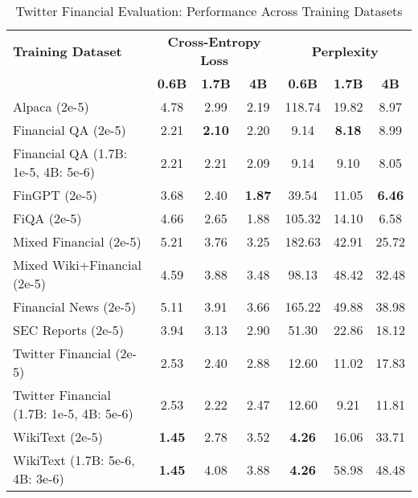 
\begin{table}[h]
\centering
\caption[Twitter Financial Evaluation: Cross-Dataset Performance]{Twitter Financial Evaluation: Performance Across Training Datasets}
\label{tab:cross_twitter}
\begin{tabular}{l|ccc|ccc}
\hline
\textbf{Training Dataset} & \multicolumn{3}{c|}{\textbf{Cross-Entropy Loss}} & \multicolumn{3}{c}{\textbf{Perplexity}} \\
\cline{2-4} \cline{5-7}
  & \textbf{0.6B} & \textbf{1.7B} & \textbf{4B} & \textbf{0.6B} & \textbf{1.7B} & \textbf{4B} \\
Alpaca (2e-5) & 4.78 & 2.99 & 2.19 & 118.74 & 19.82 & 8.97  \\
Financial QA (2e-5) & 2.21 & \textbf{2.10} & 2.20 & 9.14 & \textbf{8.18} & 8.99  \\
Financial QA (1.7B: 1e-5, 4B: 5e-6) & 2.21 & 2.21 & 2.09 & 9.14 & 9.10 & 8.05  \\
FinGPT (2e-5) & 3.68 & 2.40 & \textbf{1.87} & 39.54 & 11.05 & \textbf{6.46}  \\
FiQA (2e-5) & 4.66 & 2.65 & 1.88 & 105.32 & 14.10 & 6.58  \\
Mixed Financial (2e-5) & 5.21 & 3.76 & 3.25 & 182.63 & 42.91 & 25.72  \\
Mixed Wiki+Financial (2e-5) & 4.59 & 3.88 & 3.48 & 98.13 & 48.42 & 32.48  \\
Financial News (2e-5) & 5.11 & 3.91 & 3.66 & 165.22 & 49.88 & 38.98  \\
SEC Reports (2e-5) & 3.94 & 3.13 & 2.90 & 51.30 & 22.86 & 18.12  \\
Twitter Financial (2e-5) & 2.53 & 2.40 & 2.88 & 12.60 & 11.02 & 17.83  \\
Twitter Financial (1.7B: 1e-5, 4B: 5e-6) & 2.53 & 2.22 & 2.47 & 12.60 & 9.21 & 11.81  \\
WikiText (2e-5) & \textbf{1.45} & 2.78 & 3.52 & \textbf{4.26} & 16.06 & 33.71  \\
WikiText (1.7B: 5e-6, 4B: 3e-6) & \textbf{1.45} & 4.08 & 3.88 & \textbf{4.26} & 58.98 & 48.48  \\
\hline
\end{tabular}
\end{table}

